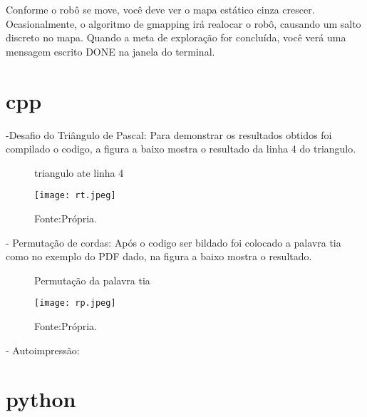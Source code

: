 Conforme o robô se move, você deve ver o mapa estático cinza crescer. Ocasionalmente, o algoritmo de gmapping irá realocar o robô, causando um salto discreto no mapa. Quando a meta de exploração for concluída, você verá uma mensagem escrito DONE na janela do terminal.
\section{cpp}
-Desafio do Triângulo de Pascal:
Para demonstrar os resultados obtidos foi compilado o codigo, a figura a baixo mostra o resultado da linha 4 do triangulo.
\begin{figure} [h!]	
    \centering
    \caption{triangulo ate linha 4}
    \texttt{[image: rt.jpeg]}
    \caption*{Fonte:Própria.}
    \label{fig:triangulodepascal}
\end{figure}

- Permutação de cordas:
Após o codigo ser bildado foi colocado a palavra tia como no exemplo do PDF dado, na figura a baixo mostra o resultado.
\begin{figure} [h!]	
    \centering
    \caption{Permutação da palavra tia}
    \texttt{[image: rp.jpeg]}
    \caption*{Fonte:Própria.}
    \label{fig:permutacao}
\end{figure}
- Autoimpressão:

\section{python}








